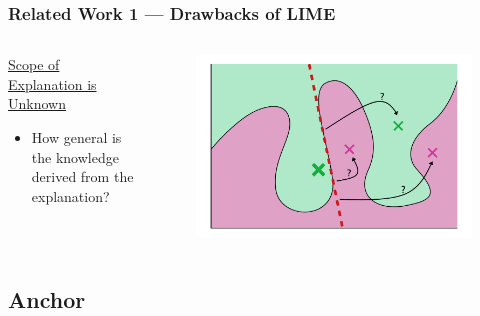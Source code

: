 \documentclass[aspectratio=169]{slide-ja}
\begin{document}
\begin{frame}
  \frametitle{Related Work 1 — Drawbacks of LIME}
  \begin{columns}[]
    \begin{column}{0.4\textwidth}
      \underline{Scope of Explanation is Unknown}

      \bigskip
      \begin{itemize}
        \item How general is the knowledge derived from the explanation?
      \end{itemize}
    \end{column}
    \begin{column}{0.45\textwidth}
      \begin{figure}
        \includegraphics[width=\textwidth]{src/lime_drawback}
      \end{figure}
    \end{column}
  \end{columns}
\end{frame}

\subsection{Anchor}
\end{document}
